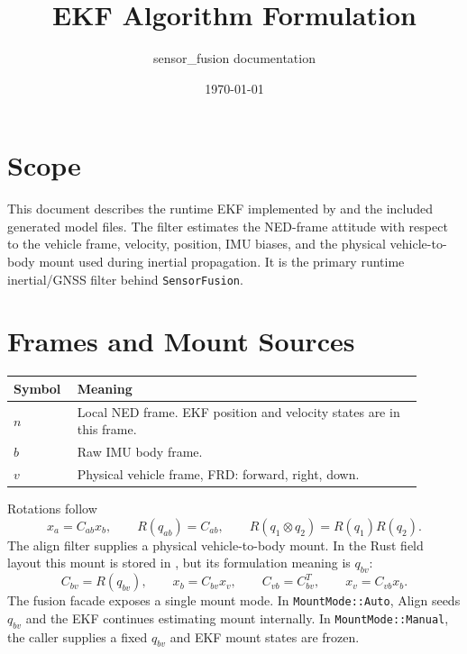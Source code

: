 \documentclass[11pt]{article}
\title{EKF Algorithm Formulation}
\author{sensor\_fusion documentation}
\date{\today}
\newcommand{\T}{^{T}}
\begin{document}
\maketitle
\tableofcontents
\newpage

\section{Scope}

This document describes the runtime EKF implemented by
 and the included generated model files. The
filter estimates the NED-frame attitude with respect to the vehicle frame,
velocity, position, IMU biases, and the physical vehicle-to-body mount used
during inertial propagation.
It is the primary runtime inertial/GNSS filter behind \texttt{SensorFusion}.

\section{Frames and Mount Sources}

\begin{longtable}{>{\raggedright\arraybackslash}p{0.12\linewidth} >{\raggedright\arraybackslash}p{0.78\linewidth}}
\toprule
\textbf{Symbol} & \textbf{Meaning} \\
\midrule
\(n\) & Local NED frame. EKF position and velocity states are in this frame. \\
\(b\) & Raw IMU body frame. \\
\(v\) & Physical vehicle frame, FRD: forward, right, down. \\
\bottomrule
\end{longtable}

Rotations follow
\begin{equation}
  x_a=C_{ab}x_b,\qquad R(q_{ab})=C_{ab},\qquad
  R(q_1\otimes q_2)=R(q_1)R(q_2).
\end{equation}
The align filter supplies a physical vehicle-to-body mount. In the Rust field
layout this mount is stored in , but its formulation meaning
is \(q_{bv}\):
\begin{equation}
  C_{bv}=R(q_{bv}),\qquad x_b=C_{bv}x_v,\qquad
  C_{vb}=C_{bv}\T,\qquad x_v=C_{vb}x_b .
\end{equation}
The fusion facade exposes a single mount mode. In \texttt{MountMode::Auto},
Align seeds \(q_{bv}\) and the EKF continues estimating mount internally. In
\texttt{MountMode::Manual}, the caller supplies a fixed \(q_{bv}\) and EKF
mount states are frozen.
\end{document}
